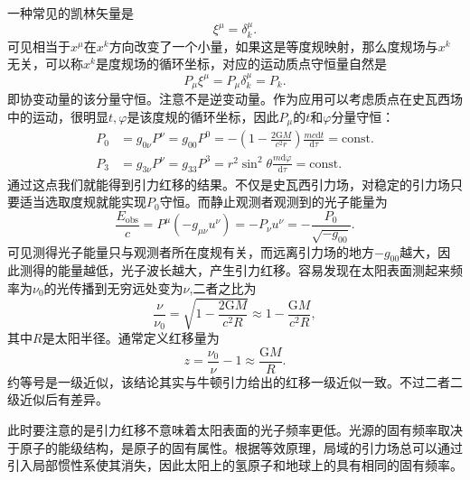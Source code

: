 \documentclass[11pt, a4paper, oneside, onecolumn]{ctexart}
\numberwithin{equation}{subsection}
\begin{document}
一种常见的凯林矢量是
\begin{equation}
\xi^{\mu}=\delta{}^{\mu}_{k}.
\end{equation}
可见相当于$x^{\mu}$在$x^{k}$方向改变了一个小量，如果这是等度规映射，那么度规场与$x^{k}$无关，可以称$x^{k}$是度规场的循环坐标，对应的运动质点守恒量自然是
\begin{equation}
P_{\mu}\xi^{\mu}=P_{\mu}\delta{}^{\mu}_{k}=P_{k}.
\end{equation}
即协变动量的该分量守恒。注意不是逆变动量。作为应用可以考虑质点在史瓦西场中的运动，很明显$t,\varphi$是该度规的循环坐标，因此$P_{\mu}$的$t$和$\varphi$分量守恒：
\begin{align}
P_{0}&=g_{0\nu}P^{\nu}=g_{00}P^{0}=-\left(1-\frac{2\mathrm{G}M}{c^{2}r}\right)\frac{mc\mathrm{d}t}{\mathrm{d}\tau}=\text{const}.\\
P_{3}&=g_{3\nu}P^{\nu}=g_{33}P^{3}=r^{2}\sin^{2}\theta\frac{m\mathrm{d}\varphi}{\mathrm{d}\tau}=\text{const}.
\end{align}
通过这点我们就能得到引力红移的结果。不仅是史瓦西引力场，对稳定的引力场只要适当选取度规就能实现$P_{0}$守恒。而静止观测者观测到的光子能量为
\begin{equation}
\frac{E_{\text{obs}}}{c}=P^{\mu}\left(-g_{\mu\nu}u^{\nu}\right)=-P_{\nu}u^{\nu}=-\frac{P_{0}}{\sqrt{-g_{00}}}.
\end{equation}
可见测得光子能量只与观测者所在度规有关，而远离引力场的地方$-g_{00}$越大，因此测得的能量越低，光子波长越大，产生引力红移。容易发现在太阳表面测起来频率为$\nu_{0}$的光传播到无穷远处变为$\nu$,二者之比为
\begin{equation}
\frac{\nu}{\nu_{0}}=\sqrt{1-\frac{2\mathrm{G}M}{c^{2}R}}\approx1-\frac{\mathrm{G}M}{c^{2}R},
\end{equation}
其中$R$是太阳半径。通常定义红移量为
\begin{equation}
z=\frac{\nu_{0}}{\nu}-1\approx\frac{\mathrm{G}M}{R}.
\end{equation}
约等号是一级近似，该结论其实与牛顿引力给出的红移一级近似一致。不过二者二级近似后有差异。

此时要注意的是引力红移不意味着太阳表面的光子频率更低。光源的固有频率取决于原子的能级结构，是原子的固有属性。根据等效原理，局域的引力场总可以通过引入局部惯性系使其消失，因此太阳上的氢原子和地球上的具有相同的固有频率。
\end{document}
